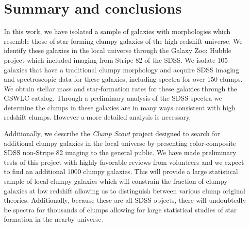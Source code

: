 \section{Summary and conclusions}
In this work, we have isolated a sample of galaxies with morphologies which resemble those of star-forming clumpy galaxies of the high-redshift universe. We identify these galaxies in the local universe through the Galaxy Zoo: Hubble project which included imaging from Stripe 82 of the SDSS. We isolate 105 galaxies that have a traditional clumpy morphology and acquire SDSS imaging and spectroscopic data for these galaxies, including spectra for over 150 clumps. We obtain stellar mass and star-formation rates for these galaxies through the GSWLC catalog. Through a preliminary analysis of the SDSS spectra we determine the clumps in these galaxies are in many ways consistent with high redshift clumps. However a more detailed analysis is necessary. 

Additionally, we describe the \textit{Clump Scout} project designed to search for additional clumpy galaxies in the local universe by presenting color-composite SDSS non-Stripe 82 imaging to the general public. We have made preliminary tests of this project with highly favorable reviews from volunteers and we expect to find an additional 1000 clumpy galaxies. This will provide a large statistical sample of local clumpy galaxies which will constrain the fraction of clumpy galaxies at low redshift allowing us to distinguish between various clump original theories. Additionally, because these are all SDSS objects, there will undoubtedly be spectra for thousands of clumps allowing for large statistical studies of star formation in the nearby universe. 